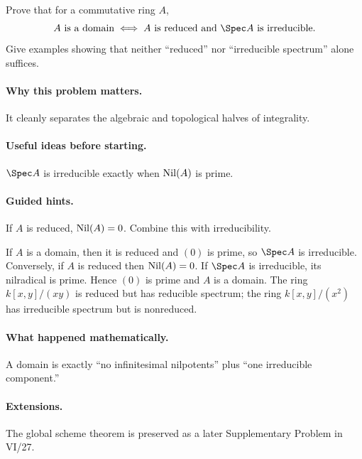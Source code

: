 \begin{problem}
Prove that for a commutative ring $A$,
\[
A\text{ is a domain}
\iff
A\text{ is reduced and }\Spec A\text{ is irreducible}.
\]
Give examples showing that neither ``reduced'' nor ``irreducible spectrum'' alone suffices.
\end{problem}
\paragraph{Why this problem matters.}
It cleanly separates the algebraic and topological halves of integrality.
\paragraph{Useful ideas before starting.}
$\Spec A$ is irreducible exactly when $\operatorname{Nil}(A)$ is prime.
\paragraph{Guided hints.}
If $A$ is reduced, $\operatorname{Nil}(A)=0$.  Combine this with irreducibility.
\begin{solution}
If $A$ is a domain, then it is reduced and $(0)$ is prime, so $\Spec A$ is irreducible.
Conversely, if $A$ is reduced then $\operatorname{Nil}(A)=0$.  If $\Spec A$ is irreducible, its
nilradical is prime.  Hence $(0)$ is prime and $A$ is a domain.
The ring $k[x,y]/(xy)$ is reduced but has reducible spectrum; the ring
$k[x,y]/(x^2)$ has irreducible spectrum but is nonreduced.
\end{solution}
\paragraph{What happened mathematically.}
A domain is exactly ``no infinitesimal nilpotents'' plus ``one irreducible component.''
\paragraph{Extensions.}
The global scheme theorem is preserved as a later Supplementary Problem in VI/27.
